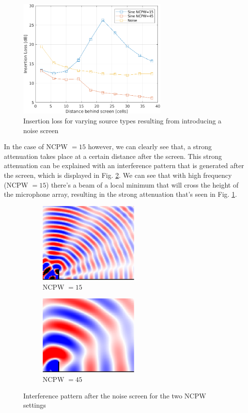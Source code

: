 \documentclass[twocolumn]{article}
\begin{document}
\begin{figure}[H]
    \centering
    \includegraphics[width=75mm]{./Images/3_3_insertion_loss.png}
    \caption{Insertion loss for varying source types resulting from introducing a noise screen}
    \label{fig_3_3_loss}
\end{figure}

In the case of NCPW $= 15$ however, we can clearly see that, a strong attenuation takes
place at a certain distance after the screen.
This strong attenuation can be explained with an interference pattern that is
generated after the screen, which is displayed in Fig. \ref{fig_3_3_interference}.
We can see that with high frequency (NCPW $=15$) there's a beam of a local minimum that will
cross the height of the microphone array, resulting in the strong attenuation
that's seen in Fig. \ref{fig_3_3_loss}.

\begin{figure}[H]
    \begin{subfigure}[]{75mm}
        \centering
        \includegraphics[width=50mm]{./Images/3_3_ncpw_15.png}
        \caption{NCPW $= 15$}
    \end{subfigure}
    \begin{subfigure}[]{75mm}
        \centering
        \includegraphics[width=50mm]{./Images/3_3_ncpw_45.png}
        \caption{NCPW $= 45$}
    \end{subfigure}
    \caption{Interference pattern after the noise screen for the two NCPW settings}
    \label{fig_3_3_interference}
\end{figure}
\end{document}
